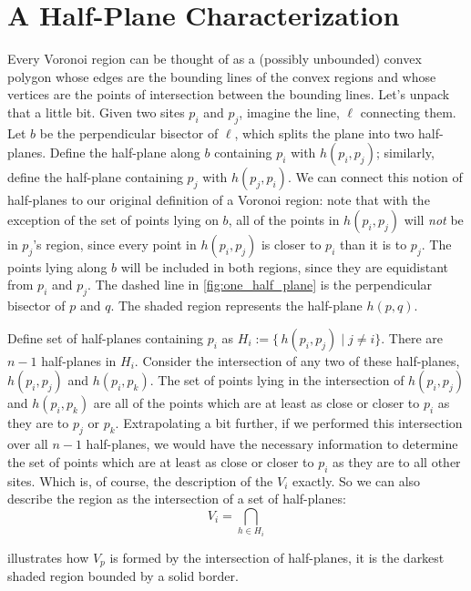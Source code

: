 \documentclass[12pt,twoside]{reedthesis}
\begin{document}
  \section{A Half-Plane Characterization} %
  \label{sec:half_plane_char}
    Every Voronoi region can be thought of as a (possibly unbounded) convex polygon whose edges are the bounding lines of the convex regions and whose vertices are the points of intersection between the bounding lines.  Let's unpack that a little bit. Given two sites $p_{i}$ and $p_{j}$, imagine the line, $\ell$ connecting them. Let $b$ be the perpendicular bisector of $\ell$, which splits the plane into two half-planes. Define the half-plane along $b$ containing $p_{i}$ with $h(p_{i}, p_{j})$; similarly, define the half-plane containing $p_{j}$ with $h(p_{j}, p_{i})$. We can connect this notion of half-planes to our original definition of a Voronoi region: note that with the exception of the set of points lying on $b$, all of the points in $h(p_{i}, p_{j})$ will \emph{not} be in $p_{j}$'s region, since every point in $h(p_{i}, p_{j})$ is closer to $p_{i}$ than it is to $p_{j}$. The points lying along $b$ will be included in both regions, since they are equidistant from $p_{i}$ and $p_{j}$. The dashed line in \cref{fig:one_half_plane} is the perpendicular bisector of $p$ and $q$. The shaded region represents the half-plane $h(p, q)$.\par

    Define set of half-planes containing $p_{i}$ as $H_{i} := \{\,h(p_{i}, p_{j}) \mid j\neq i \}$. There are $n-1$ half-planes in $H_{i}$. Consider the intersection of any two of these half-planes, $h(p_{i}, p_{j})$ and $h(p_{i}, p_{k})$. The set of points lying in the intersection of $h(p_{i}, p_{j})$ and $h(p_{i}, p_{k})$ are all of the points which are at least as close or closer to $p_{i}$ as they are to $p_{j}$ or $p_{k}$. Extrapolating a bit further, if we performed this intersection over all $n-1$ half-planes, we would have the necessary information to determine the set of points which are at least as close or closer to $p_{i}$ as they are to all other sites. Which is, of course, the description of the $V_{i}$ exactly. So we can also describe the region as the intersection of a set of half-planes:
    $$V_{i} = \bigcap_{h \in H_{i}}$$ 

     illustrates how $V_{p}$ is formed by the intersection of half-planes, it is the darkest shaded region bounded by a solid border.
\end{document}
